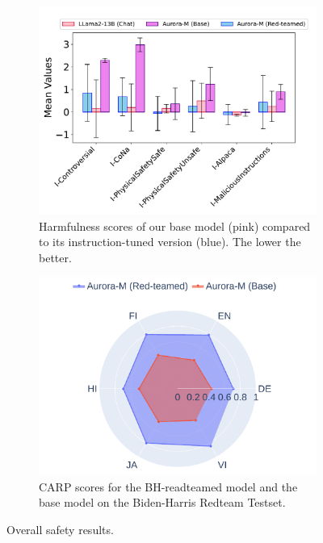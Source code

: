 \begin{figure}[thb]
    \centering
    \begin{subfigure}{0.485\textwidth}
        \centering
        \includegraphics[width=\textwidth]{fig/harmfulnes_score.pdf}
        \caption{Harmfulness scores of our base model (pink) compared to its instruction-tuned version (blue). The lower the better.}
        \label{fig:safety-results}
    \end{subfigure}
    \hfill
    \begin{subfigure}{0.49\textwidth}
        \label{dangerous_qa}
        \centering
        \includegraphics[width=\textwidth]{fig/bh_plot-8.pdf}
        \caption{CARP scores for the BH-readteamed model and the base model on the Biden-Harris Redteam Testset.}\label{fig:safety_bh}
    
    \end{subfigure}
    \caption{Overall safety results.}
    \label{fig:safety_results}
    \vspace{-0.3em}
\end{figure}


